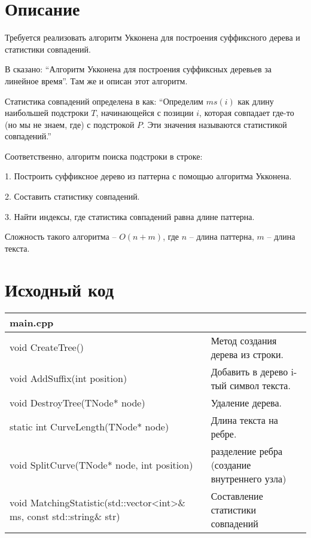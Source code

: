 \section{Описание}
Требуется реализовать алгоритм Укконена для построения суффиксного дерева и статистики совпадений.

В \cite{Gusfield} сказано: \enquote{Алгоритм Укконена для построения суффиксных деревьев за линейное время}. 
Там же и описан этот алгоритм.

Статистика совпадений определена в \cite{Gusfield} как:
\enquote{Определим $ms(i)$ как длину наибольшей подстроки $T$, начинающейся с позиции $i$, 
которая совпадает где-то (но мы не знаем, где) с подстрокой $P$. Эти значения называются статистикой совпадений.}

Соответственно, алгоритм поиска подстроки в строке:

1. Построить суффиксное дерево из паттерна с помощью алгоритма Укконена.

2. Составить статистику совпадений.

3. Найти индексы, где статистика совпадений равна длине паттерна.

Сложность такого алгоритма -- $O(n + m)$, где $n$ -- длина паттерна, $m$ -- длина текста.

\pagebreak

\section{Исходный код}
\begin{longtable}{|p{7.5cm}|p{7.5cm}|}
\hline
\rowcolor{lightgray}
\multicolumn{2}{|c|} {main.cpp}\\
\hline
void CreateTree()&Метод создания дерева из строки.\\
\hline
void AddSuffix(int position)&
Добавить в дерево i-тый символ текста.\\
\hline
void DestroyTree(TNode* node)&Удаление дерева.\\
\hline
static int CurveLength(TNode* node)&Длина текста на ребре.\\
\hline
void SplitCurve(TNode* node, int position)&разделение ребра (создание внутреннего узла)\\
\hline
void MatchingStatistic(std::vector<int>\& ms, const std::string\& str)&Составление статистики совпадений\\
\hline
\end{longtable}

